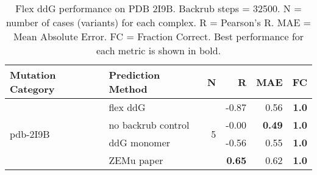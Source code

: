 \begin{table}
  \begin{tabular}{llrrrr}
\toprule
Mutation Category &   Prediction Method &  N &     R &  MAE &  FC \\
\midrule
 \multirow{ 4}{*}{pdb-2I9B} & flex ddG & \multirow{ 4}{*}{5} & -0.87 & 0.56 & \textbf{1.0}  \\
 & no backrub control & & -0.00 & \textbf{0.49} & \textbf{1.0}  \\
 & ddG monomer & & -0.56 & 0.55 & \textbf{1.0}  \\
 & ZEMu paper & & \textbf{0.65} & 0.62 & \textbf{1.0}  \\
\bottomrule
\end{tabular}
  \caption[Flex ddG performance on PDB 2I9B]{
    Flex ddG performance on PDB 2I9B. Backrub steps = 32500. N = number of cases (variants) for each complex. R = Pearson's R. MAE = Mean Absolute Error. FC = Fraction Correct. Best performance for each metric is shown in bold.
  } \label{tab:table-pdb-2I9B}
\end{table}
